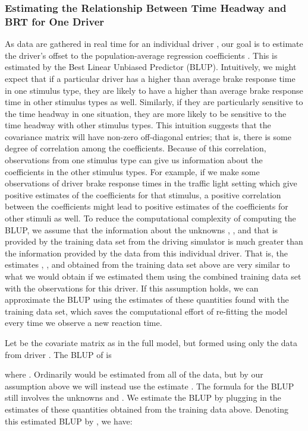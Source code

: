 \documentclass[conference]{IEEEtran}
\begin{document}
\subsubsection{Estimating the Relationship Between Time Headway and BRT for One Driver}
As data are gathered in real time for an individual driver , our goal is to estimate the driver's offset  to the population-average regression coefficients .  This is estimated by the Best Linear Unbiased Predictor (BLUP).
Intuitively, we might expect that if a particular driver has a higher than average brake response time in one stimulus type, they are likely to have a higher than average brake response time in other stimulus types as well.  Similarly, if they are particularly sensitive to the time headway in one situation, they are more likely to be sensitive to the time headway with other stimulus types.  This intuition suggests that the covariance matrix  will have non-zero off-diagonal entries; that is, there is some degree of correlation among the  coefficients.  Because of this correlation, observations from one stimulus type can give us information about the coefficients in the other stimulus types.  For example, if we make some observations of driver brake response times in the traffic light setting which give positive estimates of the  coefficients for that stimulus, a positive correlation between the coefficients might lead to positive estimates of the coefficients for other stimuli as well.
To reduce the computational complexity of computing the BLUP, we assume that the information about the unknowns , , and  that is provided by the training data set from the driving simulator is much greater than the information provided by the data from this individual driver.  That is, the estimates , , and  obtained from the training data set above are very similar to what we would obtain if we estimated them using the combined training data set with the observations for this driver.  If this assumption holds, we can approximate the BLUP using the estimates of these quantities found with the training data set, which saves the computational effort of re-fitting the model every time we observe a new reaction time.

Let  be the covariate matrix  as in the full model, but formed using only the data from driver .  The BLUP of  is

where .  Ordinarily  would be estimated from all of the data, but by our assumption above we will instead use the estimate .  The formula for the BLUP still involves the unknowns  and .  We estimate the BLUP by plugging in the estimates of these quantities obtained from the training data above.  Denoting this estimated BLUP by , we have:
\end{document}

